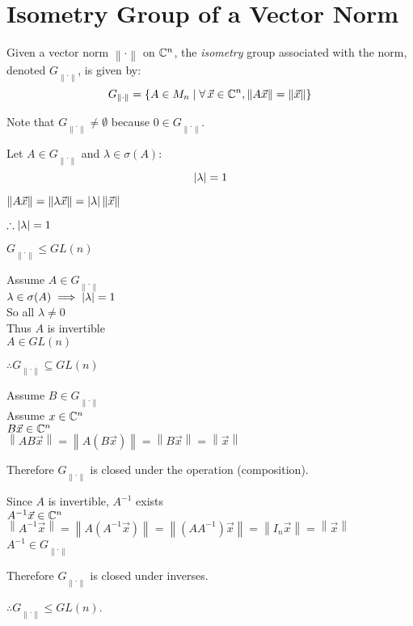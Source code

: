\documentclass[letterpaper,12pt,fleqn]{article}
\newcommand{\norm}[1]{\left\lVert#1\right\rVert}
\newcommand{\vx}{\vec{x}}
\renewcommand{\l}{\lambda}
\renewcommand{\o}{\sigma}
\newcommand{\ig}{G_{\norm{\cdot}}}
\begin{document}
\section*{Isometry Group of a Vector Norm}

\begin{definition}
  Given a vector norm $\norm{\cdot}$ on $\mathbb{C}^n$, the \emph{isometry} group
  associated with the norm, denoted $\ig$, is given by:
  \[\ig=\{A\in M_n\mid\forall\,\vx\in\C^n,\norm{A\vx}=\norm{\vx}\}\]
\end{definition}

Note that $\ig\ne\emptyset$ because $0\in\ig$.

\begin{lemma}
  Let $A\in\ig$ and $\l\in\o(A)$:
  \[\abs{\l}=1\]
\end{lemma}

\begin{theproof}
  $\norm{A\vx}=\norm{\l\vx}=\abs{\l}\norm{\vx}$

  $\therefore\abs{\l}=1$
\end{theproof}

\begin{theorem}
  $\ig\le GL(n)$
\end{theorem}

\begin{theproof}
  Assume $A\in\ig$ \\
  $\l\in\o(A)\implies\abs{\l}=1$ \\
  So all $\l\ne0$ \\
  Thus $A$ is invertible \\
  $A\in GL(n)$

  $\therefore\ig\subseteq GL(n)$

  Assume $B\in\ig$ \\
  Assume $x\in\mathbb{C}^n$ \\
  $B\vx\in\C^n$ \\
  $\norm{AB\vx}=\norm{A(B\vx)}=\norm{B\vx}=\norm{\vx}$

  Therefore $\ig$ is closed under the operation (composition).

  Since $A$ is invertible, $A^{-1}$ exists \\
  $A^{-1}\vx\in\C^n$ \\
  $\norm{A^{-1}\vx}=\norm{A(A^{-1}\vx)}=\norm{(AA^{-1})\vx}=\norm{I_n\vx}=
  \norm{\vx}$ \\
  $A^{-1}\in\ig$

  Therefore $\ig$ is closed under inverses.

  $\therefore\ig\le GL(n)$.
\end{theproof}
\end{document}

